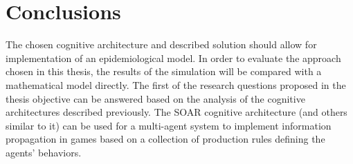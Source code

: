 \section{Conclusions}

The chosen cognitive architecture and described solution should allow for implementation of an epidemiological model.
In order to evaluate the approach chosen in this thesis, the results of the simulation will be compared with a mathematical model directly.
The first of the research questions proposed in the thesis objective can be answered based on the analysis of the cognitive architectures described previously.
The SOAR cognitive architecture (and others similar to it) can be used for a multi-agent system to implement information propagation in games based on a collection of production rules defining the agents' behaviors.

